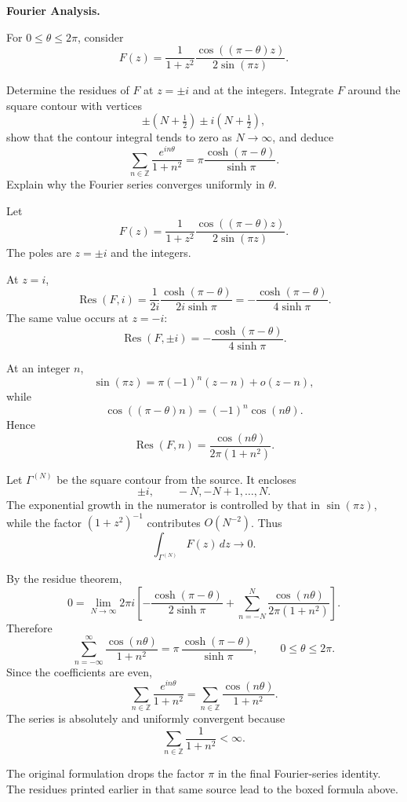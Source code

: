 \begin{problem}[CP-II-0324]
\label{prob:cp-ii-0324}
\textbf{Fourier Analysis.}

\hspace*{1.5em}For \(0\le\theta\le2\pi\), consider
\[
F(z)=
\frac{1}{1+z^2}
\frac{\cos((\pi-\theta)z)}{2\sin(\pi z)}.
\]

Determine the residues of \(F\) at \(z=\pm i\) and at the integers.
Integrate \(F\) around the square contour with vertices
\[
\pm\left(N+\tfrac12\right)
\pm i\left(N+\tfrac12\right),
\]
show that the contour integral tends to zero as \(N\to\infty\), and deduce
\[
\sum_{n\in\mathbb Z}
\frac{e^{in\theta}}{1+n^2}
=
\pi\frac{\cosh(\pi-\theta)}{\sinh\pi}.
\]
Explain why the Fourier series converges uniformly in \(\theta\).
\end{problem}

\begin{solution}
Let
\[
F(z)
=
\frac{1}{1+z^2}
\frac{\cos((\pi-\theta)z)}{2\sin(\pi z)}.
\]
The poles are \(z=\pm i\) and the integers.

At \(z=i\),
\[
\operatorname{Res}(F,i)
=
\frac{1}{2i}
\frac{\cosh(\pi-\theta)}{2i\sinh\pi}
=
-\frac{\cosh(\pi-\theta)}{4\sinh\pi}.
\]
The same value occurs at \(z=-i\):
\[
\boxed{
\operatorname{Res}(F,\pm i)
=
-\frac{\cosh(\pi-\theta)}{4\sinh\pi}.
}
\]

At an integer \(n\),
\[
\sin(\pi z)
=
\pi(-1)^n(z-n)+o(z-n),
\]
while
\[
\cos((\pi-\theta)n)
=
(-1)^n\cos(n\theta).
\]
Hence
\[
\boxed{
\operatorname{Res}(F,n)
=
\frac{\cos(n\theta)}{2\pi(1+n^2)}.
}
\]

Let \(\Gamma^{(N)}\) be the square contour from the source. It encloses
\[
\pm i,\qquad -N,-N+1,\ldots,N.
\]
The exponential growth in the numerator is controlled by that in
\(\sin(\pi z)\), while the factor \((1+z^2)^{-1}\) contributes \(O(N^{-2})\).
Thus
\[
\int_{\Gamma^{(N)}}F(z)\,dz\longrightarrow0.
\]

By the residue theorem,
\[
0
=
\lim_{N\to\infty}
2\pi i
\left[
-\frac{\cosh(\pi-\theta)}{2\sinh\pi}
+
\sum_{n=-N}^{N}
\frac{\cos(n\theta)}{2\pi(1+n^2)}
\right].
\]
Therefore
\[
\boxed{
\sum_{n=-\infty}^{\infty}
\frac{\cos(n\theta)}{1+n^2}
=
\pi\,
\frac{\cosh(\pi-\theta)}{\sinh\pi},
\qquad
0\le\theta\le2\pi.
}
\]
Since the coefficients are even,
\[
\sum_{n\in\mathbb Z}
\frac{e^{in\theta}}{1+n^2}
=
\sum_{n\in\mathbb Z}
\frac{\cos(n\theta)}{1+n^2}.
\]
The series is absolutely and uniformly convergent because
\[
\sum_{n\in\mathbb Z}\frac1{1+n^2}<\infty.
\]

The original formulation drops the factor \(\pi\) in the final Fourier-series identity. The
residues printed earlier in that same source lead to the boxed formula above.
\end{solution}


